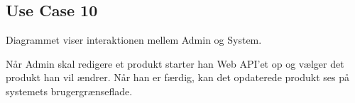 \subsection{Use Case 10}
Diagrammet viser interaktionen mellem Admin og System.


Når Admin skal redigere et produkt starter han Web API'et op og vælger det produkt han vil ændrer. Når han er færdig, kan det opdaterede produkt ses på systemets brugergrænseflade.